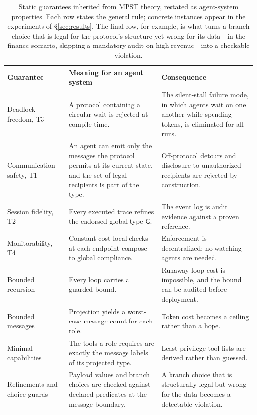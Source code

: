 \documentclass{article}
\newcommand{\gtG}{\mathsf{G}}
\begin{document}
\begin{table}[t]
\centering\small
\caption{Static guarantees inherited from MPST theory, restated as agent-system properties. Each row states the general rule; concrete instances appear in the experiments of \S\ref{sec:results}. The final row, for example, is what turns a branch choice that is legal for the protocol's structure yet wrong for its data---in the finance scenario, skipping a mandatory audit on high revenue---into a checkable violation.}
\label{tab:guarantees}
\begin{tabular}{@{}p{2.9cm}p{6.0cm}p{5.4cm}@{}}
\toprule
\textbf{Guarantee} & \textbf{Meaning for an agent system} & \textbf{Consequence} \\
\midrule
Deadlock-freedom, T3 & A protocol containing a circular wait is rejected at compile time. & The silent-stall failure mode, in which agents wait on one another while spending tokens, is eliminated for all runs. \\
Communication safety, T1 & An agent can emit only the messages the protocol permits at its current state, and the set of legal recipients is part of the type. & Off-protocol detours and disclosure to unauthorized recipients are rejected by construction. \\
Session fidelity, T2 & Every executed trace refines the endorsed global type $\gtG$. & The event log is audit evidence against a proven reference. \\
Monitorability, T4 & Constant-cost local checks at each endpoint compose to global compliance. & Enforcement is decentralized; no watching agents are needed. \\
Bounded recursion & Every loop carries a guarded bound. & Runaway loop cost is impossible, and the bound can be audited before deployment. \\
Bounded messages & Projection yields a worst-case message count for each role. & Token cost becomes a ceiling rather than a hope. \\
Minimal capabilities & The tools a role requires are exactly the message labels of its projected type. & Least-privilege tool lists are derived rather than guessed. \\
Refinements and choice guards & Payload values and branch choices are checked against declared predicates at the message boundary. & A branch choice that is structurally legal but wrong for the data becomes a detectable violation. \\
\bottomrule
\end{tabular}
\end{table}
\end{document}
